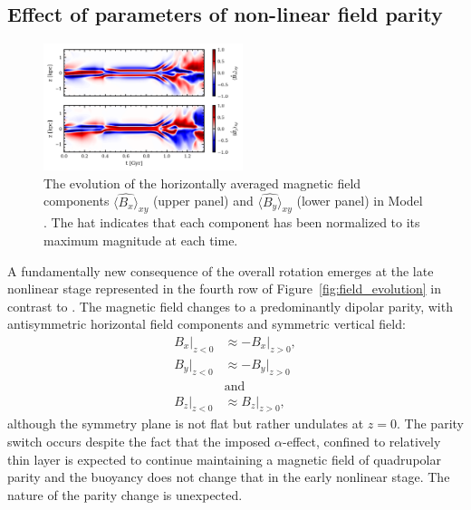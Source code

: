 \documentclass[fleqn,usenatbib]{mnras}
\newcommand{\RSOBSD}{{\sf{O60q0.3}}}
\begin{document}
\subsection{Effect of parameters of non-linear field parity}\label{sec:parity}


\begin{figure}%
    \centering
    \includegraphics[width=0.52\textwidth]{Ra5h3.png}
    \caption{The evolution of the horizontally averaged magnetic field
components $\langle\widehat{B_x}\rangle_{xy}$ (upper panel) and
$\langle\widehat{B_y}\rangle_{xy}$ (lower panel) in Model {\RSOBSD}.  The hat
indicates that each component has been normalized to its maximum magnitude at
each time.}
    \label{fig:xy_averages}
\end{figure}%

A fundamentally new consequence of the overall rotation emerges at the late
nonlinear stage represented in the fourth row of
Figure~\ref{fig:field_evolution} {in contrast to \citet{QSTGB23}.  T}he
magnetic field changes {to a predominantly dipolar parity}, with
antisymmetric horizontal field components and symmetric vertical field:
{\begin{align}
B_x|_{z<0}&\approx-B_x|_{z>0},\nonumber\\
B_y|_{z<0}&\approx-B_y|_{z>0}\nonumber\\
 &\text{and}\nonumber\\
B_z|_{z<0}&\approx B_z|_{z>0},
\end{align}
}although the
symmetry plane is not flat but rather {undulates at} $z=0$. {The parity
switch occurs} despite the fact that the imposed $\alpha$-effect, confined to
relatively thin layer is expected to continue maintaining a magnetic field of
quadrupolar parity and the buoyancy does not change that in the early nonlinear
stage.  The nature of the parity change is unexpected{.}
\end{document}
